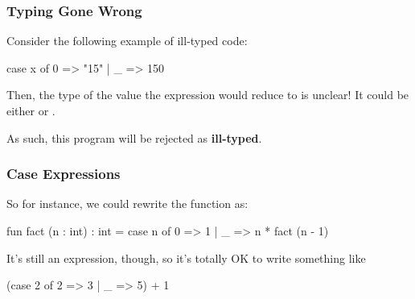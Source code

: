 \documentclass[aspectratio=169]{beamer}
\begin{document}
\begin{frame}[fragile]
  \frametitle{Typing Gone Wrong}

  Consider the following example of ill-typed code:

  \begin{codeblock}
    case x of
      0 => "15" 
    | _ => 150 
  \end{codeblock}

  \vspace{\fill}

  Then, the type of the value the expression would reduce to is unclear! It could
  be either  or .   

  \vspace{\fill}

  As such, this program will be rejected as \textbf{ill-typed}.
\end{frame}

\begin{frame}[fragile]
  \frametitle{Case Expressions}
  So for instance, we could rewrite the  function as:

  \begin{codeblock}
    fun fact (n : int) : int = 
      case n of
        0 => 1
      | _ => n * fact (n - 1)
  \end{codeblock}

  \vspace{\fill}


  \vspace{\fill}

  It's still an expression, though, so it's totally OK to write something like
  \begin{codeblock}
    (case 2 of
      2 => 3
    | _ => 5) + 1 
  \end{codeblock}
\end{frame}
\end{document}
